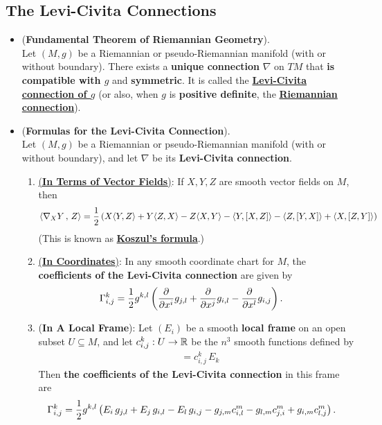 \documentclass[11pt]{article}
\begin{document}
\subsection{The Levi-Civita Connections}
\begin{itemize}
\item \begin{theorem} (\textbf{Fundamental Theorem of Riemannian Geometry}). \citep{lee2018introduction}\\
Let $(M, g)$ be a Riemannian or pseudo-Riemannian manifold (with or without boundary). There exists a \textbf{unique connection} $\nabla$ on $TM$ that \textbf{is compatible with $g$} and \textbf{symmetric}. It is called the \underline{\textbf{Levi-Civita connection of $g$}} (or also, when $g$ is \textbf{positive definite}, the \underline{\textbf{Riemannian connection}}).
\end{theorem}

\item \begin{corollary} (\textbf{Formulas for the Levi-Civita Connection}). \citep{lee2018introduction}\\
Let  $(M, g)$ be a Riemannian or pseudo-Riemannian manifold (with or without boundary), and let $\nabla$ be its \textbf{Levi-Civita connection}.
\begin{enumerate}
\item  \underline{(\textbf{In Terms of Vector Fields})}: If $X, Y, Z$ are smooth vector fields on $M$, then
\begin{align}
\left\langle \nabla_{X}{Y}\,,\, Z \right\rangle &=\frac{1}{2}\left(X\langle{Y,Z}\rangle + Y\langle{Z,X}\rangle - Z\langle{X,Y}\rangle -  \langle{Y, [X, Z]}\rangle - \langle{Z, [Y, X]}\rangle + \langle{X, [Z, Y]}\rangle\right)\label{eqn: levi_civita_formula_vector_fields}
\end{align}
(This is known as \underline{\textbf{Koszul's formula}}.)
\item \underline{(\textbf{In Coordinates})}: In any smooth coordinate chart for $M$, the \textbf{coefficients of the Levi-Civita connection} are given by
\begin{align}
\Gamma_{i,j}^{k} &= \frac{1}{2}g^{k,l}\left( \frac{\partial }{ \partial x^i}g_{j,l} + \frac{\partial }{ \partial x^j}g_{i,l} - \frac{\partial }{ \partial x^l}g_{i,j} \right).\label{eqn: levi_civita_formula_christoffel_symbol_metric}
\end{align}
\item (\textbf{In A Local Frame}): Let $(E_i)$ be a smooth \textbf{local frame} on an open subset $U \subseteq M$, and let $c_{i,j}^{k}: U \rightarrow {\mathbb R}$ be the $n^3$ smooth functions defined by
\begin{align}
[E_i, E_j] &= c_{i,j}^k \, E_k\label{eqn: coefficient_lie_bracket}
\end{align}
Then \textbf{the coefficients of the Levi-Civita connection} in this frame are
\begin{align}
\Gamma_{i,j}^{k} &= \frac{1}{2}g^{k,l}\left(E_i\,g_{j,l} + E_j\,g_{i,l} - E_l\,g_{i,j} - g_{j,m}c_{i,l}^{m} - g_{l,m}c_{j,i}^m + g_{i,m}c_{l,j}^m\right). \label{eqn: levi_civita_formula_christoffel_symbol_local_frames}
\end{align}


\end{enumerate}
\end{corollary}
\end{itemize}
\end{document}
